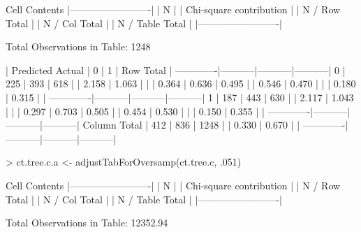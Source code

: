 \documentclass{article}
\begin{document}
\begin{Schunk}
\begin{Soutput}
   Cell Contents
|-------------------------|
|                       N |
| Chi-square contribution |
|           N / Row Total |
|           N / Col Total |
|         N / Table Total |
|-------------------------|

 
Total Observations in Table:  1248 

 
             | Predicted 
      Actual |         0 |         1 | Row Total | 
-------------|-----------|-----------|-----------|
           0 |       225 |       393 |       618 | 
             |     2.158 |     1.063 |           | 
             |     0.364 |     0.636 |     0.495 | 
             |     0.546 |     0.470 |           | 
             |     0.180 |     0.315 |           | 
-------------|-----------|-----------|-----------|
           1 |       187 |       443 |       630 | 
             |     2.117 |     1.043 |           | 
             |     0.297 |     0.703 |     0.505 | 
             |     0.454 |     0.530 |           | 
             |     0.150 |     0.355 |           | 
-------------|-----------|-----------|-----------|
Column Total |       412 |       836 |      1248 | 
             |     0.330 |     0.670 |           | 
-------------|-----------|-----------|-----------|
\end{Soutput}
\begin{Sinput}
> ct.tree.c.a <- adjustTabForOversamp(ct.tree.c, .051)
\end{Sinput}
\begin{Soutput}
   Cell Contents
|-------------------------|
|                       N |
| Chi-square contribution |
|           N / Row Total |
|           N / Col Total |
|         N / Table Total |
|-------------------------|

 
Total Observations in Table:  12352.94 


\end{Soutput}
\end{Schunk}
\end{document}
